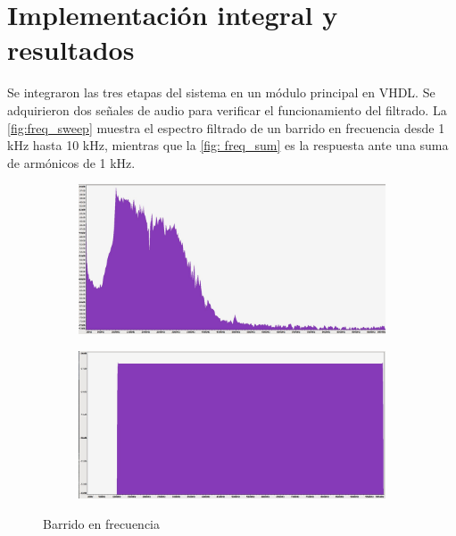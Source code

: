 \documentclass[12pt,letterpaper]{article}
\begin{document}
\section{Implementación integral y resultados}

Se integraron las tres etapas del sistema en un módulo principal en VHDL. Se adquirieron dos señales de audio para verificar el funcionamiento del filtrado. La \ref{fig:freq_sweep} muestra el espectro filtrado de un barrido en frecuencia desde 1 kHz hasta 10 kHz, mientras que la \ref{fig: freq_sum} es la respuesta ante una suma de armónicos de 1 kHz. 

\begin{figure}[h!]
    \centering
    \begin{subfigure}[Espectro de la señal filtrada]
        \centering
        \includegraphics[width=0.45\linewidth]{Freq_sweep.jpg}
    \end{subfigure}
    
    \begin{subfigure}[Espectro de la señal original]
        \centering
        \includegraphics[width=0.45\linewidth]{Orig_sweep.jpg}
    \end{subfigure}
    \caption{Barrido en frecuencia}
\end{figure}
\end{document}

